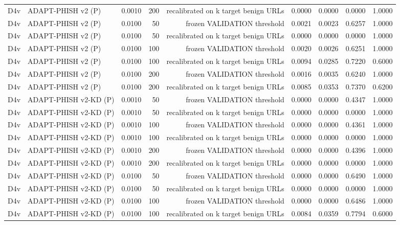 \begin{table}[t]
\begin{tabular}{llrrrrrrr}
D4v & ADAPT-PHISH v2 (P) & 0.0010 & 200 & recalibrated on k target benign URLs & 0.0000 & 0.0000 & 0.0000 & 1.0000 \\
D4v & ADAPT-PHISH v2 (P) & 0.0100 & 50 & frozen VALIDATION threshold & 0.0021 & 0.0023 & 0.6257 & 1.0000 \\
D4v & ADAPT-PHISH v2 (P) & 0.0100 & 50 & recalibrated on k target benign URLs & 0.0000 & 0.0000 & 0.0000 & 1.0000 \\
D4v & ADAPT-PHISH v2 (P) & 0.0100 & 100 & frozen VALIDATION threshold & 0.0020 & 0.0026 & 0.6251 & 1.0000 \\
D4v & ADAPT-PHISH v2 (P) & 0.0100 & 100 & recalibrated on k target benign URLs & 0.0094 & 0.0285 & 0.7220 & 0.6000 \\
D4v & ADAPT-PHISH v2 (P) & 0.0100 & 200 & frozen VALIDATION threshold & 0.0016 & 0.0035 & 0.6240 & 1.0000 \\
D4v & ADAPT-PHISH v2 (P) & 0.0100 & 200 & recalibrated on k target benign URLs & 0.0085 & 0.0353 & 0.7370 & 0.6200 \\
D4v & ADAPT-PHISH v2-KD (P) & 0.0010 & 50 & frozen VALIDATION threshold & 0.0000 & 0.0000 & 0.4347 & 1.0000 \\
D4v & ADAPT-PHISH v2-KD (P) & 0.0010 & 50 & recalibrated on k target benign URLs & 0.0000 & 0.0000 & 0.0000 & 1.0000 \\
D4v & ADAPT-PHISH v2-KD (P) & 0.0010 & 100 & frozen VALIDATION threshold & 0.0000 & 0.0000 & 0.4361 & 1.0000 \\
D4v & ADAPT-PHISH v2-KD (P) & 0.0010 & 100 & recalibrated on k target benign URLs & 0.0000 & 0.0000 & 0.0000 & 1.0000 \\
D4v & ADAPT-PHISH v2-KD (P) & 0.0010 & 200 & frozen VALIDATION threshold & 0.0000 & 0.0000 & 0.4396 & 1.0000 \\
D4v & ADAPT-PHISH v2-KD (P) & 0.0010 & 200 & recalibrated on k target benign URLs & 0.0000 & 0.0000 & 0.0000 & 1.0000 \\
D4v & ADAPT-PHISH v2-KD (P) & 0.0100 & 50 & frozen VALIDATION threshold & 0.0000 & 0.0000 & 0.6490 & 1.0000 \\
D4v & ADAPT-PHISH v2-KD (P) & 0.0100 & 50 & recalibrated on k target benign URLs & 0.0000 & 0.0000 & 0.0000 & 1.0000 \\
D4v & ADAPT-PHISH v2-KD (P) & 0.0100 & 100 & frozen VALIDATION threshold & 0.0000 & 0.0000 & 0.6486 & 1.0000 \\
D4v & ADAPT-PHISH v2-KD (P) & 0.0100 & 100 & recalibrated on k target benign URLs & 0.0084 & 0.0359 & 0.7794 & 0.6000 \\

\end{tabular}
\end{table}
